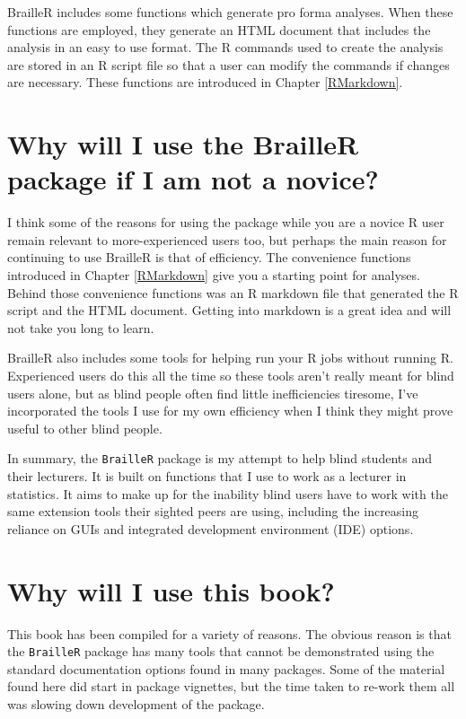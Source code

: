 \documentclass[
]{book}
\begin{document}
BrailleR includes some functions which generate pro forma analyses. When these functions are employed, they generate an HTML document that includes the analysis in an easy to use format. The R commands used to create the analysis are stored in an R script file so that a user can modify the commands if changes are necessary. These functions are introduced in Chapter \ref{RMarkdown}.

\hypertarget{why-will-i-use-the-brailler-package-if-i-am-not-a-novice}{%
\section{Why will I use the BrailleR package if I am not a novice?}\label{why-will-i-use-the-brailler-package-if-i-am-not-a-novice}}

I think some of the reasons for using the package while you are a novice R user remain relevant to more-experienced users too, but perhaps the main reason for continuing to use BrailleR is that of efficiency.
The convenience functions introduced in Chapter \ref{RMarkdown} give you a starting point for analyses. Behind those convenience functions was an R markdown file that generated the R script and the HTML document. Getting into markdown is a great idea and will not take you long to learn.

BrailleR also includes some tools for helping run your R jobs without running R. Experienced users do this all the time so these tools aren't really meant for blind users alone, but as blind people often find little inefficiencies tiresome, I've incorporated the tools I use for my own efficiency when I think they might prove useful to other blind people.

In summary, the \texttt{BrailleR} package is my attempt to help blind students and their lecturers. It is built on functions that I use to work as a lecturer in statistics. It aims to make up for the inability blind users have to work with the same extension tools their sighted peers are using, including the increasing reliance on GUIs and integrated development environment (IDE) options.

\hypertarget{why-will-i-use-this-book}{%
\section{Why will I use this book?}\label{why-will-i-use-this-book}}

This book has been compiled for a variety of reasons. The obvious reason is that the \texttt{BrailleR} package has many tools that cannot be demonstrated using the standard documentation options found in many packages. Some of the material found here did start in package vignettes, but the time taken to re-work them all was slowing down development of the package.
\end{document}
